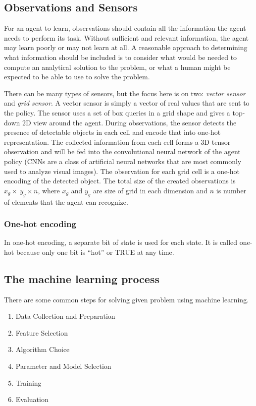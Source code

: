 \subsection{Observations and Sensors}
For an agent to learn, observations should contain all the information the agent needs to perform its task. Without sufficient and relevant information, the agent may learn poorly or may not learn at all. A reasonable approach to determining what information should be included is to consider what would be needed to compute an analytical solution to the problem, or what a human might be expected to be able to use to solve the problem. 

There can be many types of sensors, but the focus here is on two: \emph{vector sensor} and \emph{grid sensor}. A vector sensor is simply a vector of real values that are sent to the policy. The sensor uses a set of box queries in a grid shape and gives a top-down 2D view around the agent. During observations, the sensor detects the presence of detectable objects in each cell and encode that into one-hot representation. The collected information from each cell forms a 3D tensor observation and will be fed into the convolutional neural network of the agent policy (CNNs are a class of artificial neural networks that are most commonly used to analyze visual images). The observation for each grid cell is a one-hot encoding of the detected object. The total size of the created observations is $x_g \times\ y_g \times n$, where $x_g$ and $y_g$ are size of grid in each dimension and $n$ is number of elements that the agent can recognize. \cite{MLAgentsSensors}

\subsubsection{One-hot encoding}

In one-hot encoding, a separate bit of state is used for each state. It is called one-hot because only one bit is “hot” or TRUE at any time. \cite{harrisOneHot}

\subsection{The machine learning process}
There are some common steps for solving given problem using machine learning.
\begin{enumerate}
    \item Data Collection and Preparation
    \item Feature Selection
    \item Algorithm Choice
    \item Parameter and Model Selection
    \item Training
    \item Evaluation \cite{marsland_2015}
\end{enumerate}

